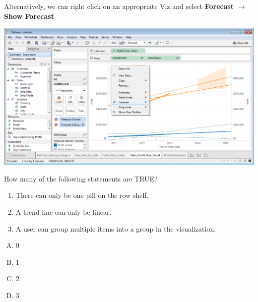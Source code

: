 \documentclass[xcolor=svgnames]{beamer} %
\begin{document}
\begin{frame}
Alternatively, we can right click on an appropriate Viz and  select {\bf Forecast} $\to$ {\bf Show Forecast}
\begin{center}
\includegraphics[width=.99\textwidth]{img/forcast}
\end{center}
\end{frame}

\begin{frame}
\begin{example}
How many of the following statements are TRUE?
\begin{enumerate}
\item There can only be one pill on the row shelf.
\item A trend line can only be linear.
\item A user can group multiple items into a group in the visualization.
\end{enumerate}
\begin{multicols}{5}
\begin{enumerate}[A)]
\item 0 
\item 1
\item 2
\item 3
\end{enumerate}
\end{multicols}
\end{example}
\end{frame}
\end{document}
